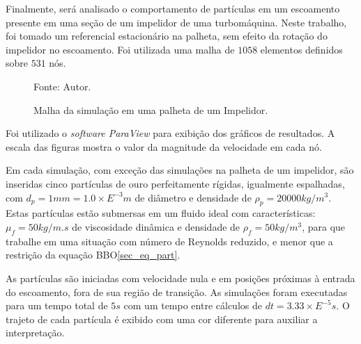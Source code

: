 \begin{itemize}
        Finalmente, será analisado o comportamento de partículas em um escoamento presente em uma seção de um impelidor de uma turbomáquina.
        Neste trabalho, foi tomado um referencial estacionário na palheta, sem efeito da rotação do impelidor no escoamento.
        Foi utilizada uma malha de $1058$ elementos definidos sobre $531$ nós.
        \begin{figure}[H]
            \centering
             {\raggedleft \scriptsize Fonte: Autor.}
            \caption{Malha da simulação em uma palheta de um Impelidor.}
            \label{rotor_mesh}
        \end{figure}
\end{itemize}

Foi utilizado o \textit{software ParaView} para exibição dos gráficos de resultados.
A escala das figuras mostra o valor da magnitude da velocidade em cada nó.

Em cada simulação, com exceção das simulações na palheta de um impelidor, são inseridas cinco partículas de ouro perfeitamente rígidas, igualmente espalhadas, com $d_p=1mm=1.0\times E^{-3}m$ de diâmetro e densidade de $\rho_p=20000kg/m^3$.
Estas partículas estão submersas em um fluido ideal com características: $\mu_f=50kg/m.s$ de viscosidade dinâmica e densidade de $\rho_f=50kg/m^3$, para que trabalhe em uma situação com número de Reynolds reduzido, e menor que a restrição da equação BBO\eqref{sec_eq_part}.

As partículas são iniciadas com velocidade nula e em posições próximas à entrada do escoamento, fora de sua região de transição.
As simulações foram executadas para um tempo total de $5s$ com um tempo entre cálculos de $dt=3.33\times E^{-5}s$.
O trajeto de cada partícula é exibido com uma cor diferente para auxiliar a interpretação. 

